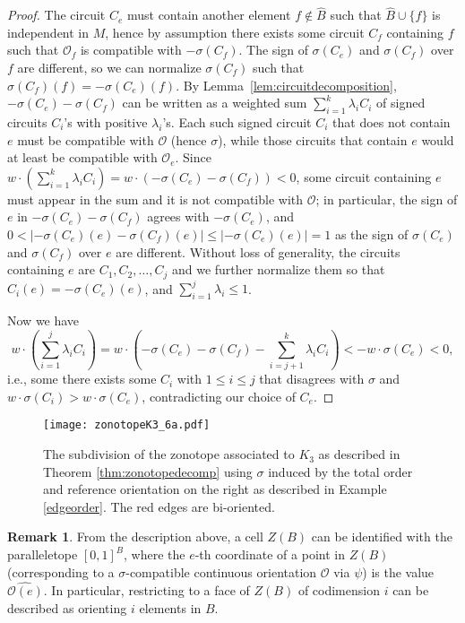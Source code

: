 \documentclass[12pt]{amsart}
\numberwithin{equation}{section}
\theoremstyle{definition}
\newtheorem{remark}[theorem]{Remark}
\begin{document}
\begin{proof}
The circuit $C_e$ must contain another element $f\not\in\hat{B}$ such that $\hat{B}\cup\{f\}$ is independent in $M$, hence by assumption there exists some circuit $C_f$ containing $f$ such that $\mathcal{O}_f$ is compatible with $-\sigma(C_f)$. The sign of $\sigma(C_e)$ and $\sigma(C_f)$ over $f$ are different, so we can normalize $\sigma(C_f)$ such that $\sigma(C_f)(f)=-\sigma(C_e)(f)$. By Lemma~\ref{lem:circuitdecomposition}, $-\sigma(C_e)-\sigma(C_f)$ can be written as a weighted sum $\sum_{i=1}^k \lambda_iC_i$ of signed circuits $C_i$'s with positive $\lambda_i$'s.  Each such signed circuit $C_i$ that does not contain $e$ must be compatible with $\mathcal{O}$ (hence $\sigma$), while those circuits that contain $e$ would at least be compatible with $\mathcal{O}_e$. Since $w\cdot(\sum_{i=1}^k \lambda_iC_i)=w\cdot(-\sigma(C_e)-\sigma(C_f))<0$, some circuit containing $e$ must appear in the sum and it is not compatible with $\mathcal{O}$; in particular, the sign of $e$ in $-\sigma(C_e)-\sigma(C_f)$ agrees with $-\sigma(C_e)$, and $0<|-\sigma(C_e)(e)-\sigma(C_f)(e)|\leq|-\sigma(C_e)(e)|=1$ as the sign of $\sigma(C_e)$ and $\sigma(C_f)$ over $e$ are different. Without loss of generality, the circuits containing $e$ are $C_1,C_2,\ldots,C_j$ and we further normalize them so that $C_i(e)=-\sigma(C_e)(e)$, and $\sum_{i=1}^j\lambda_i\leq 1$.

Now we have 
\[
w\cdot (\sum_{i=1}^j \lambda_iC_i)=w\cdot \left(-\sigma(C_e)-\sigma(C_f)-\sum_{i=j+1}^k \lambda_iC_i \right)<-w\cdot\sigma(C_e)<0,
\]
i.e., some there exists some $C_i$ with $1\leq i\leq j$ that disagrees with $\sigma$ and $w\cdot\sigma(C_i)>w\cdot\sigma(C_e)$, contradicting our choice of $C_e$.
\end{proof}

\begin{figure}[ht!]
\begin{center}
    \texttt{[image: zonotopeK3\_6a.pdf]}
\end{center}
  \caption{The subdivision of the zonotope associated to $K_3$ as described in Theorem \ref{thm:zonotopedecomp} using $\sigma$ induced by the total order and reference orientation on the right as described in Example \ref{edgeorder}.
  The red edges are bi-oriented.}
  \label{zonotopeK3_6}
\end{figure}

\begin{remark} \label{rmk:facedescription}
From the description above, a cell $Z(B)$ can be identified with the paralleletope $[0,1]^B$, where the $e$-th coordinate of a point in $Z(B)$ (corresponding to a $\sigma$-compatible continuous orientation ${\mathcal O}$ via $\psi$) is the value $\widehat{{\mathcal O}(e)}$. In particular, restricting to a face of $Z(B)$ of codimension $i$ can be described as orienting $i$ elements in $B$.
\end{remark}
\end{document}
